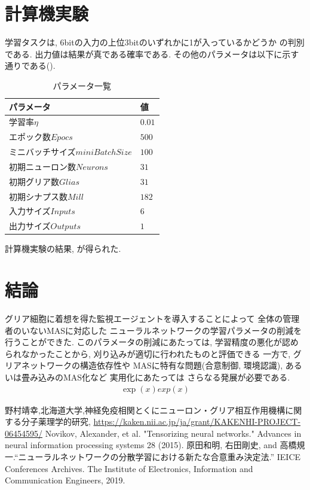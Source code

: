 \documentclass[a4paper,10.5pt,twocolumn]{jsarticle}
\begin{document}
\section{計算機実験}
学習タスクは, 6bitの入力の上位3bitのいずれかに1が入っているかどうか
の判別である. 出力値は結果が真である確率である. 
その他のパラメータは以下に示す通りである().
\begin{table}[H]
  \caption{パラメータ一覧}
  \label{tab:param}
  \centering
   \begin{tabular}{ll}
    \toprule
      パラメータ&値\\\midrule\midrule
      学習率$\eta$&$0.01$\\
      エポック数$Epocs$&$500$\\
      ミニバッチサイズ$miniBatchSize$&$100$\\
      初期ニューロン数$Neurons$&$31$\\
      初期グリア数$Glias$&$31$\\
      初期シナプス数$Mill$&$182$\\
      入力サイズ$Inputs$&$6$\\
      出力サイズ$Outputs$&$1$\\
    \bottomrule
   \end{tabular}
 \end{table}
計算機実験の結果, が得られた.


 
\section{結論}
グリア細胞に着想を得た監視エージェントを導入することによって
全体の管理者のいないMASに対応した
ニューラルネットワークの学習パラメータの削減を行うことができた.
このパラメータの削減にあたっては, 学習精度の悪化が認められなかったことから, 
刈り込みが適切に行われたものと評価できる
一方で, グリアネットワークの構造依存性や
MASに特有な問題(合意制御, 環境認識), あるいは畳み込みのMAS化など
実用化にあたっては
さらなる発展が必要である.
\begin{align}
  \exp(x) exp(x)
\end{align}
 \begin{thebibliography}{99}
野村靖幸,北海道大学,神経免疫相関とくにニューロン・グリア相互作用機構に関する分子薬理学的研究, \url{https://kaken.nii.ac.jp/ja/grant/KAKENHI-PROJECT-06454595/}
  Novikov, Alexander, et al. "Tensorizing neural networks." Advances in neural information processing systems 28 (2015).
  原田和明, 右田剛史, and 高橋規一.``ニューラルネットワークの分散学習における新たな合意重み決定法.'' IEICE Conferences Archives. The Institute of Electronics, Information and Communication Engineers, 2019.
\end{thebibliography}
 
\end{document}
